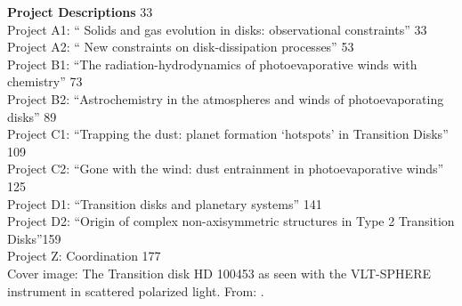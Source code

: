\documentclass[10pt,fleqn,twoside]{article}
\begin{document}
{\bf Project Descriptions } \hfill 33 \\
Project A1: `` Solids and gas evolution in disks: observational
constraints'' \hfill  33 \\
Project A2: ``
New constraints on disk-dissipation processes''  \hfill 53 \\
Project B1: ``The radiation-hydrodynamics of photoevaporative winds
with chemistry'' \hfill 73 \\
Project B2: ``Astrochemistry in the atmospheres and winds of
photoevaporating disks'' \hfill 89 \\
Project C1: ``Trapping the dust:
planet formation ‘hotspots’ in Transition Disks'' \hfill 109 \\
Project C2: ``Gone with the wind:
dust entrainment in photoevaporative winds'' \hfill 125 \\
Project D1: ``Transition disks and planetary systems'' \hfill 141\\
Project D2: ``Origin of complex non-axisymmetric structures in Type 2 Transition Disks''\hfill 159 \\
Project Z: Coordination \hfill 177 \\




\vfill
Cover image: The Transition disk HD 100453 as seen with the VLT-SPHERE 
instrument in scattered polarized light. From: \citet{2017A&A...597A..42B}.

\pagebreak[4]

\pagestyle{plain}
\end{document}
